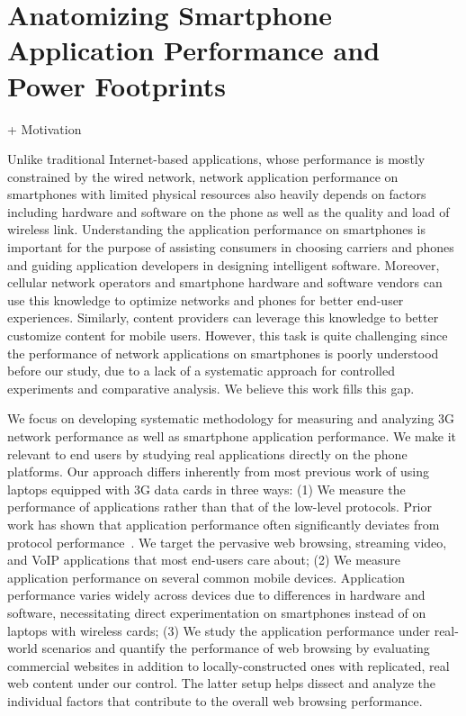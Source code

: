 \chapter{Anatomizing Smartphone Application Performance and Power Footprints} \label{chap:app}

	+ Motivation
	
	Unlike traditional Internet-based applications, whose performance is mostly constrained by the wired network, network application performance on smartphones with limited physical resources also heavily depends on factors including hardware and software on the 
phone as well as the quality and load of wireless link. Understanding 
the application performance on smartphones is important for the 
purpose of assisting consumers in choosing carriers and phones and 
guiding application developers in designing intelligent software. 
Moreover, cellular network operators and smartphone hardware and 
software vendors can use this knowledge to optimize networks and 
phones for better end-user experiences. Similarly, content providers 
can leverage this knowledge to better customize content for mobile 
users. However, this task is quite challenging since the performance 
of network applications on smartphones is poorly understood before our study, due to a lack of a systematic approach for controlled experiments 
and comparative analysis. We believe this work fills this gap.

We focus on developing systematic methodology for measuring and
analyzing 3G network performance as well as smartphone application
performance. We make it relevant to end users by studying real
applications directly on the phone platforms. Our approach differs 
inherently from most previous work of using laptops equipped with 
3G data cards in three ways: (1) We measure the performance of 
applications rather than that of the low-level protocols. Prior 
work has shown that application performance often significantly 
deviates from protocol performance~\cite{Zhuang:A3:Mobicom2006}. 
We target the pervasive web browsing, streaming video, and VoIP
applications that most end-users care about; (2) We measure 
application performance on several common mobile devices. 
Application performance varies widely across devices due to 
differences in hardware and software, necessitating direct 
experimentation on smartphones instead of on laptops with wireless 
cards; (3) We study the application performance under real-world 
scenarios and quantify the performance of web browsing by 
evaluating commercial websites in addition to locally-constructed 
ones with replicated, real web content under our control. The 
latter setup helps dissect and analyze the individual factors 
that contribute to the overall web browsing performance.

